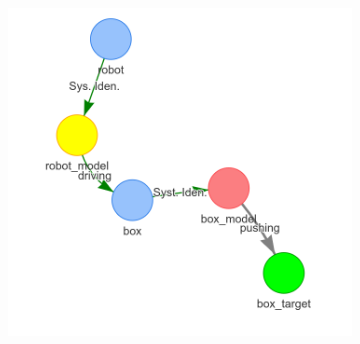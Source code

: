 \begin{figure}[H]
\begin{subfigure}{.3\textwidth}
    \includegraphics[width=1.05\textwidth]{figures/connecting_nodes/robot_push/robot_push_6}
    \caption{}\label{subfig:robot_push_6}
    \end{subfigure}


\end{figure}
